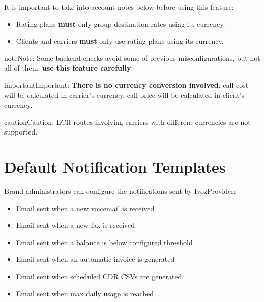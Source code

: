 \documentclass[letterpaper,10pt,english]{sphinxmanual}
\begin{document}
It is important to take into account notes below before using this feature:
\begin{itemize}
\item {} 
Rating plans \textbf{must} only group destination rates using its currency.

\item {} 
Clients and carriers \textbf{must} only use rating plans using its currency.

\end{itemize}

\begin{notice}{note}{Note:}
Some backend checks avoid some of previous misconfigurations, but not all of them: \textbf{use this feature carefully}.
\end{notice}

\begin{notice}{important}{Important:}
\textbf{There is no currency conversion involved}: call cost will be calculated in carrier's currency, call price
will be calculated in client's currency.
\end{notice}

\begin{notice}{caution}{Caution:}
LCR routes involving carriers with different currencies are not supported.
\end{notice}


\section{Default Notification Templates}
\label{administration_portal/platform/default_notification_templates::doc}\label{administration_portal/platform/default_notification_templates:default-notification-templates}\label{administration_portal/platform/default_notification_templates:id1}
Brand administrators can configure the notifications sent by IvozProvider:
\begin{itemize}
\item {} 
Email sent when a new voicemail is received

\item {} 
Email sent when a new fax is received

\item {} 
Email sent when a balance is below configured threshold

\item {} 
Email sent when an automatic invoice is generated

\item {} 
Email sent when scheduled CDR CSVs are generated

\item {} 
Email sent when max daily usage is reached

\end{itemize}
\end{document}
